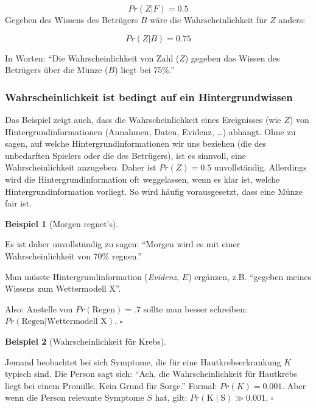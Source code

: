 \documentclass[
  ngerman,
  letterpaper,
  twoside,
  open=any]{scrbook}
\theoremstyle{definition}
\newtheorem{example}{Beispiel}[chapter]
\theoremstyle{plain}
\theoremstyle{definition}
\theoremstyle{definition}
\theoremstyle{remark}
\begin{document}
\[Pr(Z|F) = 0.5\] Gegeben des Wissens des Betrügers \(B\) wäre die
Wahrscheinlichkeit für \(Z\) anders:

\[Pr(Z|B) = 0.75\]

In Worten: \enquote{Die Wahrscheinlichkeit von Zahl (\(Z\)) gegeben das
Wissen des Betrügers über die Münze (\(B\)) liegt bei 75\%.}

\subsubsection{Wahrscheinlichkeit ist bedingt auf ein
Hintergrundwissen}\label{wahrscheinlichkeit-ist-bedingt-auf-ein-hintergrundwissen}

Das Beispiel zeigt auch, dass die Wahrscheinlichkeit eines Ereignisses
(wie \(Z\)) von Hintergrundinformationen (Annahmen, Daten, Evidenz,
\ldots) abhängt. Ohne zu sagen, auf welche Hintergrundinformationen wir
uns beziehen (die des unbedarften Spielers oder die des Betrügers), ist
es sinnvoll, eine Wahrscheinlichkeit anzugeben. Daher ist
\(Pr(Z) = 0.5\) unvollständig. Allerdings wird die
Hintergrundinformation oft weggelassen, wenn es klar ist, welche
Hintergrundinformation vorliegt. So wird häufig vorausgesetzt, dass eine
Münze fair ist.

\begin{example}[Morgen
regnet's]\protect\hypertarget{exm-bedingt}{}\label{exm-bedingt}

Es ist daher unvollständig zu sagen: \enquote{Morgen wird es mit einer
Wahrscheinlichkeit von 70\% regnen.}

Man müsste Hintergrundinformation (\emph{Evidenz}, \(E\)) ergänzen, z.B.
\enquote{gegeben meines Wissens zum Wettermodell X}.

Also: Anstelle von \(Pr(\text{Regen}) = .7\) sollte man besser
schreiben: \(Pr(\text{Regen|Wettermodell X})\). \(\square\)

\end{example}

\begin{example}[Wahrscheinlichkeit für
Krebs]\protect\hypertarget{exm-bedingt2}{}\label{exm-bedingt2}

Jemand beobachtet bei sich Symptome, die für eine Hautkrebserkrankung
\(K\) typisch sind. Die Person sagt sich: \enquote{Ach, die
Wahrscheinlichkeit für Hautkrebs liegt bei einem Promille. Kein Grund
für Sorge.} Formal: \(Pr(K) = 0.001\). Aber wenn die Person relevante
Symptome \(S\) hat, gilt: \(Pr(\text{K} \mid \text{S}) \gg 0.001\).
\(\square\)

\end{example}
\end{document}
